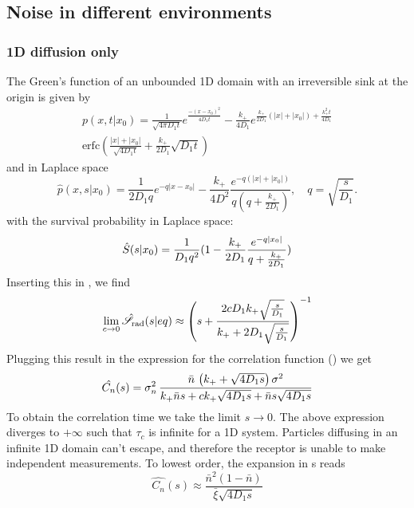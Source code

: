 \subsection{Noise in different environments}

\subsubsection{1D diffusion only}
The Green's function of an unbounded 1D domain with an irreversible sink at the origin is given by
\begin{multline}
 p(x,t|x_0) = \frac{1}{\sqrt{4 \pi D_1 t}}e^{\frac{-(x-x_0)^2}{4 D_1 t}} - \frac{k_+}{4 D_1}e^{\frac{k_+}{2 D_1}(|x|+|x_0|)+\frac{k_+^2 t}{4 D_1}} \\
\mathrm{erfc}\left( \frac{|x|+|x_0|}{\sqrt{4 D_1 t}}+\frac{k_+}{2 D_1}\sqrt{D_1 t} \right)
\end{multline}
and in Laplace space
\begin{equation}
 \hat{p}(x,s|x_0) = \frac{1}{2 D_1 q}e^{-q|x-x_0|} - \frac{k_+}{4 D^2}\frac{e^{-q(|x|+|x_0|)}}{q(q+\frac{k_+}{2 D_1})}, \quad q=\sqrt{\frac{s}{D_1}}.
\end{equation}
with the survival probability in Laplace space:
\begin{equation}
 \hat{S}(s|x_0) = \frac{1}{D_1 q^2}(1 - \frac{k_+}{2 D_1}\frac{e^{-q|x_0|}}{q+\frac{k_+}{2 D_1}})
 \elabel{LSx0}
\end{equation}
Inserting this in , we find
\begin{equation}
 \lim_{c \rightarrow 0} \hat{\mathscr{S}}_{\rm rad}(s|eq) \approx \left( s + \frac{2 c D_1 k_+ \sqrt{\frac{s}{D_1}}}{k_+ + 2 D_1 \sqrt{\frac{s}{D_1}}} \right)^{-1}
\end{equation}
Plugging this result in the expression for the correlation function () we get
\begin{equation}
  \hat{C_n}(s) = \sigma_n^2 \, \frac{\bar{n} \, \left( k_+ + \sqrt{4 D_1 s} \right) \sigma^2 }{k_+ \bar{n} s + c k_+ \sqrt{4 D_1 s} + \bar{n} s \sqrt{4 D_1 s}}
  \elabel{LapCorr1D}
\end{equation}
To obtain the correlation time we take the limit $s \rightarrow 0$. The above expression diverges to $+\infty$ such that $\tau_c$ is infinite for a 1D system. Particles diffusing in an infinite 1D domain can't escape, and therefore the receptor is unable to make independent measurements.
To lowest order, the expansion in s reads
\begin{equation}
 \hat{C_n}(s) \approx \frac{\bar{n}^2(1-\bar{n})}{\bar{\xi} \sqrt{4 D_1 s}}
\end{equation}
